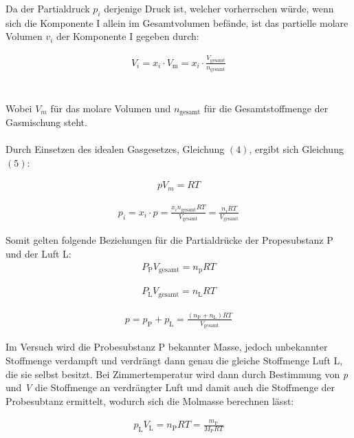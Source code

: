 \documentclass[12pt,a4paper,titlepage,headinclude,bibtotoc]{scrartcl}
\begin{document}
Da der Partialdruck $p_i$ derjenige Druck ist, welcher vorherrschen würde, wenn sich die Komponente I allein im Gesamtvolumen befände, ist das partielle molare Volumen  $v_i$ der Komponente I gegeben durch:

\begin{align}
V_i = x_i \cdot V_{\mathrm{m}}= x_i \cdot \frac{ V_{\mathrm{gesamt}}} {n_{\mathrm{gesamt}}}
\end{align}\\\\

Wobei $ V_m $ für das molare Volumen und $n_{\mathrm{gesamt}}$ für die Gesamtstoffmenge der Gasmischung steht.\\\\

Durch Einsetzen des idealen Gasgesetzes, Gleichung $(4)$, ergibt sich Gleichung $(5)$:

\begin{align}
pV_m = RT
\end{align}

\begin{align}
p_i = x_i \cdot p = \frac{x_in_{\mathrm{gesamt}}RT}{V_{\mathrm{gesamt}}} = \frac{n_iRT}{V_{\mathrm{gesamt}}}
\end{align}


Somit gelten folgende Beziehungen  für die Partialdrücke der Propesubstanz P und der Luft L:
\begin{align}
P_{\mathrm{P}}V_{\mathrm{gesamt}} = n_{\mathrm{p}}RT
\end{align}

\begin{align}
P_{\mathrm{L}}V_{\mathrm{gesamt}} = n_{\mathrm{L}}RT
\end{align}

\begin{align}
p = p_{\mathrm{P}} + p_{\mathrm{L}} = \frac{ \left( n_{\mathrm{P}} + n_{\mathrm{L}} \right)RT}{V_{\mathrm{gesamt}}}
\end{align}

Im Versuch wird die Probesubstanz P bekannter Masse, jedoch unbekannter Stoffmenge verdampft und verdrängt dann genau die gleiche Stoffmenge Luft L, die sie selbst besitzt. Bei Zimmertemperatur wird dann durch Bestimmung von \textit{p} und \textit{V} die Stoffmenge an verdrängter Luft und damit auch die Stoffmenge der Probesubtanz ermittelt, wodurch sich die Molmasse berechnen lässt:  

\begin{align}
p_{\mathrm{L}} V_{\mathrm{L}} = n_{\mathrm{P}}RT = \frac{m_{\mathrm{P}}}{M_{\mathrm{P}}RT}
\end{align}
\end{document}
